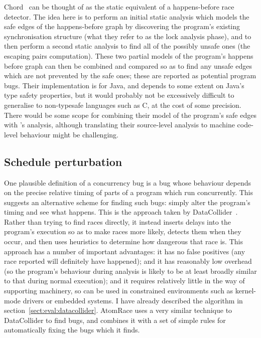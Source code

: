 Chord~\cite{Naik2006} can be thought of as the static equivalent of a
happens-before race detector.  The idea here is to perform an initial
static analysis which models the safe edges of the happens-before
graph by discovering the program's existing synchronisation structure
(what they refer to as the lock analysis phase), and to then perform a
second static analysis to find all of the possibly unsafe ones (the
escaping pairs computation).  These two partial models of the
program's happens before graph can then be combined and compared so as
to find any unsafe edges which are not prevented by the safe ones;
these are reported as potential program bugs.  Their implementation is
for Java, and depends to some extent on Java's type safety properties,
but it would probably not be excessively difficult to generalise to
non-typesafe languages such as C, at the cost of some precision.
There would be some scope for combining their model of the program's
safe edges with {\technique}'s analysis, although translating their
source-level analysis to machine code-level behaviour might be
challenging.

\subsection{Schedule perturbation}

One plausible definition of a concurrency bug is a bug whose behaviour
depends on the precise relative timing of parts of a program which run
concurrently.  This suggests an alternative scheme for finding such
bugs: simply alter the program's timing and see what happens.  This is
the approach taken by DataCollider~\cite{Erickson2010}.  Rather than
trying to find races directly, it instead inserts delays into the
program's execution so as to make races more likely, detects them when
they occur, and then uses heuristics to determine how dangerous that
race is.  This approach has a number of important advantages: it has
no false positives (any race reported will definitely have happened);
and it has reasonably low overhead (so the program's behaviour during
analysis is likely to be at least broadly similar to that during
normal execution); and it requires relatively little in the way of
supporting machinery, so can be used in constrained environments such
as kernel-mode drivers or embedded systems.  I have already described
the algorithm in section~\ref{sect:eval:datacollider}.
AtomRace\cite{Letko2008} uses a very similar technique to DataCollider
to find bugs, and combines it with a set of simple rules for
automatically fixing the bugs which it finds.

